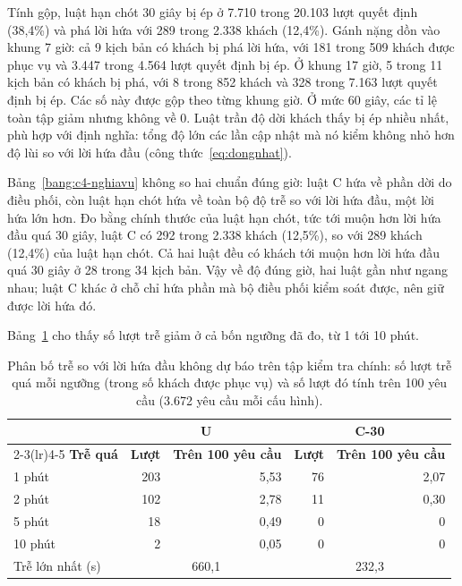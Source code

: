 Tính gộp, luật hạn chót 30 giây bị ép ở 7.710 trong 20.103 lượt quyết định (38,4\%) và phá lời hứa với 289 trong 2.338
khách (12,4\%). Gánh nặng dồn vào khung 7 giờ: cả 9 kịch bản có khách bị phá lời hứa, với 181 trong 509 khách được phục
vụ và 3.447 trong 4.564 lượt quyết định bị ép. Ở khung 17 giờ, 5 trong 11 kịch bản có khách bị phá, với 8 trong 852
khách và 328 trong 7.163 lượt quyết định bị ép. Các số này được gộp theo từng khung giờ. Ở mức 60 giây, các tỉ lệ toàn
tập giảm nhưng không về 0. Luật trần độ dời khách thấy bị ép nhiều nhất, phù hợp với định nghĩa: tổng độ lớn các lần
cập nhật mà nó kiểm không nhỏ hơn độ lùi so với lời hứa đầu (công thức~\eqref{eq:dongnhat}).

Bảng~\ref{bang:c4-nghiavu} không so hai chuẩn đúng giờ: luật C hứa về phần dời do điều phối, còn luật hạn chót hứa về
toàn bộ độ trễ so với lời hứa đầu, một lời hứa lớn hơn. Đo bằng chính thước của luật hạn chót, tức tới muộn hơn lời
hứa đầu quá 30 giây, luật C có 292 trong 2.338 khách (12,5\%), so với 289 khách (12,4\%) của luật hạn chót. Cả hai
luật đều có khách tới muộn hơn lời hứa đầu quá 30 giây ở 28 trong 34 kịch bản. Vậy về độ đúng giờ, hai luật gần như
ngang nhau; luật C khác ở chỗ chỉ hứa phần mà bộ điều phối kiểm soát được, nên giữ được lời hứa đó.

Bảng~\ref{bang:c4-phanbotre} cho thấy số lượt trễ giảm ở cả bốn ngưỡng đã đo, từ 1 tới 10 phút.

\begin{table}[htbp]
\centering
\caption[Phân bố trễ theo ngưỡng khi chưa có dự báo]{Phân bố trễ so với lời hứa đầu không dự báo trên tập kiểm tra chính: số lượt trễ quá mỗi ngưỡng
(trong số khách được phục vụ) và số lượt đó tính trên 100 yêu cầu (3.672 yêu cầu mỗi cấu hình).}
\label{bang:c4-phanbotre}
\small
\begin{tabular}{@{}lrrrr@{}}
\toprule
& \multicolumn{2}{c}{\textbf{U}} & \multicolumn{2}{c}{\textbf{C-30}}\\
\cmidrule(lr){2-3}\cmidrule(lr){4-5}
\textbf{Trễ quá} & \textbf{Lượt} & \textbf{Trên 100 yêu cầu} & \textbf{Lượt} & \textbf{Trên 100 yêu cầu}\\
\midrule
1 phút & 203 & 5,53 & 76 & 2,07\\
2 phút & 102 & 2,78 & 11 & 0,30\\
5 phút & 18 & 0,49 & 0 & 0\\
10 phút & 2 & 0,05 & 0 & 0\\
\midrule
Trễ lớn nhất (s) & \multicolumn{2}{c}{660,1} & \multicolumn{2}{c}{232,3}\\
\bottomrule
\end{tabular}
\end{table}

